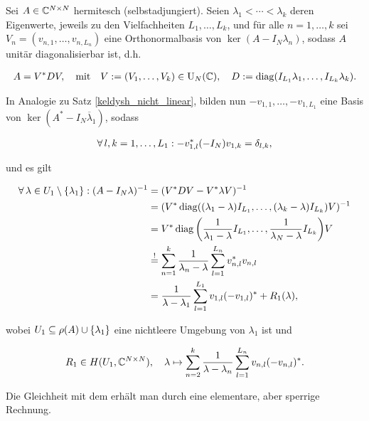 \begin{remark} \label{keldysh_hermitesch}

    Sei $A \in \mathbb{C}^{N \times N}$ hermitesch (selbstadjungiert).
    Seien $\lambda_1 < \cdots < \lambda_k$ deren Eigenwerte, jeweils zu den Vielfachheiten $L_1, \dots, L_k$, und für alle $n = 1, \dots, k$ sei $V_n = (v_{n, 1}, \dots, v_{n, L_n})$ eine Orthonormalbasis von $\ker (A - I_N \lambda_n)$, sodass $A$ unitär diagonalisierbar ist, d.h.

    \begin{align*}
        A = V^\ast D V,
        \quad
        \text{mit}
        \quad
        V := (V_1, \dots, V_k) \in \operatorname{U}_N(\mathbb{C}),
        \quad
        D := \operatorname{diag} (I_{L_1} \lambda_1, \dots, I_{L_k} \lambda_k).
    \end{align*}

    In Analogie zu Satz \ref{keldysh_nicht_linear}, bilden nun $-v_{1, 1}, \dots, -v_{1, L_1}$ eine Basis von $\ker (A^\ast - I_N \overline \lambda_1)$, sodass

    \begin{align*}
        \forall \, l, k = 1, \dots, L_1:
            -v_{1, l}^\ast (-I_N) v_{1, k} = \delta_{l, k},
    \end{align*}

    und es gilt

    \begin{align*}
        \forall \, \lambda \in U_1 \setminus {\left \{ \lambda_1 \right \}}:
            (A - I_N \lambda)^{-1}
            & =
            (V^\ast D V - V^\ast \lambda V)^{-1} \\
            & =
            (V^\ast \operatorname{diag} ((\lambda_1 - \lambda) I_{L_1}, \dots, (\lambda_k - \lambda) I_{L_k}) V)^{-1} \\
            & =
            V^\ast \operatorname{diag} {\left ( \frac{1}{\lambda_1 - \lambda} I_{L_1}, \dots, \frac{1}{\lambda_N - \lambda} I_{L_k} \right )} V \\
            & \stackrel{!}{=}
            \sum_{n=1}^k
                \frac{1}{\lambda_n - \lambda}
                \sum_{l=1}^{L_n}
                    v_{n, l}^\ast v_{n, l} \\
            & =
            \frac{1}{\lambda - \lambda_1}
            \sum_{l=1}^{L_1}
                v_{1, l} (-v_{1, l})^\ast
            +
            R_1(\lambda),
    \end{align*}

    wobei $U_1 \subseteq \rho(A) \cup {\left \{ \lambda_1 \right \}}$ eine nichtleere Umgebung von $\lambda_1$ ist und

    \begin{align*}
        R_1 \in H(U_1, \mathbb{C}^{N \times N}),
        \quad
        \lambda
        \mapsto
        \sum_{n=2}^k
            \frac{1}{\lambda - \lambda_n}
            \sum_{l=1}^{L_n}
                v_{n, l} (-v_{n, l})^\ast.
    \end{align*}

    Die Gleichheit mit dem \Quote{!} erhält man durch eine elementare, aber sperrige Rechnung.

\end{remark}
